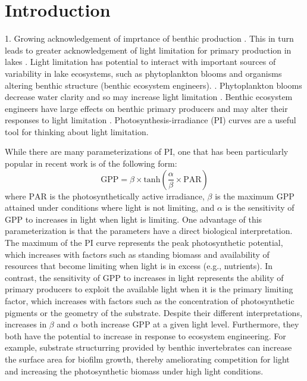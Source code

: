 \section*{Introduction}

1. Growing acknowledgement of imprtance of benthic production 
\citep{vadeboncoeur2002}
\linebreak 
{}. This in turn leads to greater acknowledgement of light limitation for primary production
in lakes
\citep{vadeboncoeur2003, karlsson2009}
\linebreak 
{}. Light limitation has potential to interact with important sources of variability in lake
ecosystems, such as phytoplankton blooms and organisms altering benthic structure
(benthic ecosystem engineers).
\linebreak 
{}. Phytoplankton blooms decrease water clarity and so may increase light limitation
\citep{scheffer2003}
\linebreak 
{}. Benthic ecosystem engineers have large effects on benthic primary producers
and may alter their responses to light limitation
\citep{phillips2019}
\linebreak 
{}. Photosynthesis-irradiance (PI) curves are a useful tool for thinking about light 
limitation.
\citep{jassby1976}
\linebreak 
\linebreak 

While there are many parameterizations of PI, 
one that has been particularly popular in recent work is of the following form:
%
\begin{equation} \label{eq:pi}
  \text{GPP} = 
    \beta \times \text{tanh}\left(\frac{\alpha} {\beta} \times \text{PAR}\right)
\end{equation}
%
where $\text{PAR}$ is the photosynthetically active irradiance,
$\beta$ is the maximum GPP attained under conditions where light is not limiting,
and $\alpha$ is the sensitivity of GPP to increases in light when light is limiting.
One advantage of this parameterization is that the parameters have a direct 
biological interpretation. 
The maximum of the PI curve represents the peak photosynthetic potential,
which increases with factors such as standing biomass and
availability of resources that become limiting when light is in excess (e.g., nutrients).
In contrast, the sensitivity of GPP to increases in light represents the ability 
of primary producers to exploit the available light when it is the primary limiting factor,
which increases with factors such as the concentration of photosynthetic pigments or the 
geometry of the substrate.
Despite their different interpretations, increases in $\beta$ and $\alpha$ both increase
GPP at a given light level.
Furthermore, they both have the potential to increase in response to 
ecosystem engineering.
For example, substrate structurring provided by benthic invertebrates can increase
the surface area for biofilm growth, 
thereby ameliorating competition for light and increasing the photosynthetic 
biomass under high light conditions.

